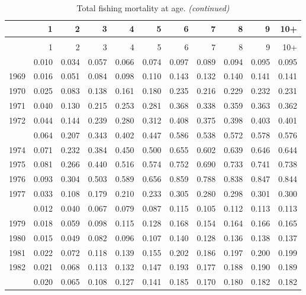 \documentclass[
]{article}
\begin{document}
\begin{longtable}[t]{lrrrrrrrrrr}
\caption{\label{tab:FAA-tot-table}Total fishing mortality at age.}\\
\toprule
  & 1 & 2 & 3 & 4 & 5 & 6 & 7 & 8 & 9 & 10+\\
\midrule
\endfirsthead
\caption[]{Total fishing mortality at age. \textit{(continued)}}\\
\toprule
  & 1 & 2 & 3 & 4 & 5 & 6 & 7 & 8 & 9 & 10+\\
\midrule
\endhead

\endfoot
\bottomrule
\endlastfoot
1968 & 0.010 & 0.034 & 0.057 & 0.066 & 0.074 & 0.097 & 0.089 & 0.094 & 0.095 & 0.095\\
1969 & 0.016 & 0.051 & 0.084 & 0.098 & 0.110 & 0.143 & 0.132 & 0.140 & 0.141 & 0.141\\
1970 & 0.025 & 0.083 & 0.138 & 0.161 & 0.180 & 0.235 & 0.216 & 0.229 & 0.232 & 0.231\\
1971 & 0.040 & 0.130 & 0.215 & 0.253 & 0.281 & 0.368 & 0.338 & 0.359 & 0.363 & 0.362\\
1972 & 0.044 & 0.144 & 0.239 & 0.280 & 0.312 & 0.408 & 0.375 & 0.398 & 0.403 & 0.401\\
\addlinespace
1973 & 0.064 & 0.207 & 0.343 & 0.402 & 0.447 & 0.586 & 0.538 & 0.572 & 0.578 & 0.576\\
1974 & 0.071 & 0.232 & 0.384 & 0.450 & 0.500 & 0.655 & 0.602 & 0.639 & 0.646 & 0.644\\
1975 & 0.081 & 0.266 & 0.440 & 0.516 & 0.574 & 0.752 & 0.690 & 0.733 & 0.741 & 0.738\\
1976 & 0.093 & 0.304 & 0.503 & 0.589 & 0.656 & 0.859 & 0.788 & 0.838 & 0.847 & 0.844\\
1977 & 0.033 & 0.108 & 0.179 & 0.210 & 0.233 & 0.305 & 0.280 & 0.298 & 0.301 & 0.300\\
\addlinespace
1978 & 0.012 & 0.040 & 0.067 & 0.079 & 0.087 & 0.115 & 0.105 & 0.112 & 0.113 & 0.113\\
1979 & 0.018 & 0.059 & 0.098 & 0.115 & 0.128 & 0.168 & 0.154 & 0.164 & 0.166 & 0.165\\
1980 & 0.015 & 0.049 & 0.082 & 0.096 & 0.107 & 0.140 & 0.128 & 0.136 & 0.138 & 0.137\\
1981 & 0.022 & 0.072 & 0.118 & 0.139 & 0.155 & 0.202 & 0.186 & 0.197 & 0.200 & 0.199\\
1982 & 0.021 & 0.068 & 0.113 & 0.132 & 0.147 & 0.193 & 0.177 & 0.188 & 0.190 & 0.189\\
\addlinespace
1983 & 0.020 & 0.065 & 0.108 & 0.127 & 0.141 & 0.185 & 0.170 & 0.180 & 0.182 & 0.182\\

\end{longtable}
\end{document}
